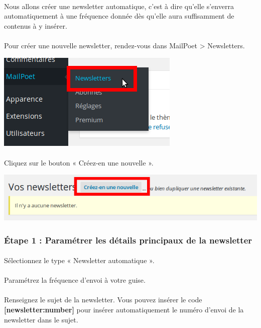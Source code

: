 \documentclass[10pt,a4paper]{article}
\begin{document}
\paragraph{}Nous allons créer une newsletter automatique, c'est à dire qu'elle s'enverra automatiquement à une fréquence donnée dès qu'elle aura suffisamment de contenus à y insérer.
\paragraph{}Pour créer une nouvelle newsletter, rendez-vous dans MailPoet > Newsletters.
\begin{center}
\includegraphics[scale=0.3]{img/0214.png}
\end{center}
\paragraph{}Cliquez sur le bouton « Créez-en une nouvelle ».
\begin{center}
\includegraphics[scale=0.3]{img/0215.png}
\end{center}
\subsubsection{Étape 1 : Paramétrer les détails principaux de la newsletter}
\paragraph{}Sélectionnez le type « Newsletter automatique ».
\paragraph{}Paramétrez la fréquence d'envoi à votre guise.
\paragraph{}Renseignez le sujet de la newsletter. Vous pouvez insérer le code \textbf{[newsletter:number]} pour insérer automatiquement le numéro d'envoi de la newsletter dans le sujet.
\end{document}
